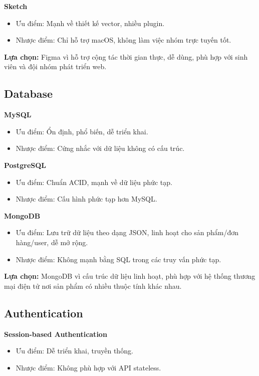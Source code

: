 \documentclass{article}
\begin{document}
\textbf{Sketch}
\begin{itemize}
    \item Ưu điểm: Mạnh về thiết kế vector, nhiều plugin.
    \item Nhược điểm: Chỉ hỗ trợ macOS, không làm việc nhóm trực tuyến tốt.
\end{itemize}

\textbf{Lựa chọn:} Figma vì hỗ trợ cộng tác thời gian thực, dễ dùng, phù hợp với sinh viên và đội nhóm phát triển web.

\subsection{Database}

\textbf{MySQL}
\begin{itemize}
    \item Ưu điểm: Ổn định, phổ biến, dễ triển khai.
    \item Nhược điểm: Cứng nhắc với dữ liệu không có cấu trúc.
\end{itemize}

\textbf{PostgreSQL}
\begin{itemize}
    \item Ưu điểm: Chuẩn ACID, mạnh về dữ liệu phức tạp.
    \item Nhược điểm: Cấu hình phức tạp hơn MySQL.
\end{itemize}

\textbf{MongoDB}
\begin{itemize}
    \item Ưu điểm: Lưu trữ dữ liệu theo dạng JSON, linh hoạt cho sản phẩm/đơn hàng/user, dễ mở rộng.
    \item Nhược điểm: Không mạnh bằng SQL trong các truy vấn phức tạp.
\end{itemize}

\textbf{Lựa chọn:} MongoDB vì cấu trúc dữ liệu linh hoạt, phù hợp với hệ thống thương mại điện tử nơi sản phẩm có nhiều thuộc tính khác nhau.

\subsection{Authentication}

\textbf{Session-based Authentication}
\begin{itemize}
    \item Ưu điểm: Dễ triển khai, truyền thống.
    \item Nhược điểm: Không phù hợp với API stateless.
\end{itemize}
\end{document}
